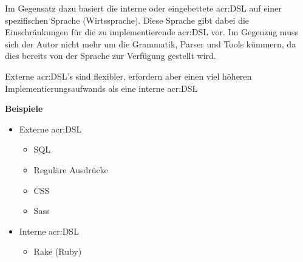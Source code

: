 Im Gegensatz dazu basiert die interne oder eingebettete \gls{acr:DSL} auf einer spezifischen Sprache (Wirtssprache). Diese Sprache gibt dabei die Einschränkungen für die zu implementierende \gls{acr:DSL} vor. Im Gegenzug muss sich der Autor nicht mehr um die Grammatik, Parser und Tools kümmern, da dies bereits von der Sprache zur Verfügung gestellt wird.

Externe \gls{acr:DSL}'s sind flexibler, erfordern aber einen viel höheren Implementierungsaufwands als eine interne \gls{acr:DSL}

\textbf{Beispiele}
\begin{itemize}
\item Externe \gls{acr:DSL}
\begin{itemize}
\item SQL
\item Reguläre Ausdrücke
\item CSS
\item Sass
\end{itemize}
\item Interne \gls{acr:DSL}
\begin{itemize}
\item Rake (Ruby)
\end{itemize}
\end{itemize}



